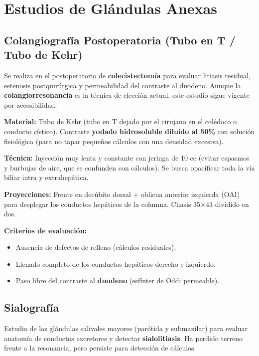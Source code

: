 \section*{Estudios de Glándulas Anexas}

\subsection*{Colangiografía Postoperatoria (Tubo en T / Tubo de Kehr)}

Se realiza en el postoperatorio de \textbf{colecistectomía} para evaluar litiasis residual, estenosis postquirúrgica y permeabilidad del contraste al duodeno. Aunque la \textbf{colangiorresonancia} es la técnica de elección actual, este estudio sigue vigente por accesibilidad.

\textbf{Material:} Tubo de Kehr (tubo en T dejado por el cirujano en el colédoco o conducto cístico). Contraste \textbf{yodado hidrosoluble diluido al 50\%} con solución fisiológica (para no tapar pequeños cálculos con una densidad excesiva).

\textbf{Técnica:} Inyección muy lenta y constante con jeringa de 10 cc (evitar espasmos y burbujas de aire, que se confunden con cálculos). Se busca opacificar toda la vía biliar intra y extrahepática.

\textbf{Proyecciones:} Frente en decúbito dorsal + oblicua anterior izquierda (OAI) para desplegar los conductos hepáticos de la columna. Chasis 35$\times$43 dividido en dos.

\textbf{Criterios de evaluación:}
\begin{itemize}[noitemsep]
	\item Ausencia de defectos de relleno (cálculos residuales).
	\item Llenado completo de los conductos hepáticos derecho e izquierdo.
	\item Paso libre del contraste al \textbf{duodeno} (esfínter de Oddi permeable).
\end{itemize}

\subsection*{Sialografía}

Estudio de las glándulas salivales mayores (parótida y submaxilar) para evaluar anatomía de conductos excretores y detectar \textbf{sialolitiasis}. Ha perdido terreno frente a la resonancia, pero persiste para detección de cálculos.

